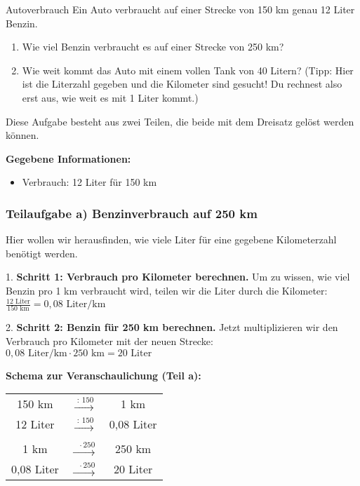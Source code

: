 \begin{aufgabenumgebung}[aufg:2.2]{Autoverbrauch} %
Ein Auto verbraucht auf einer Strecke von 150 km genau 12 Liter Benzin.
\begin{enumerate}
    \item Wie viel Benzin verbraucht es auf einer Strecke von 250 km?
    \item Wie weit kommt das Auto mit einem vollen Tank von 40 Litern? (Tipp: Hier ist die Literzahl gegeben und die Kilometer sind gesucht! Du rechnest also erst aus, wie weit es mit 1 Liter kommt.)
\end{enumerate}
\end{aufgabenumgebung}

\begin{loesungsumgebung}[loes:2.2]{} %
Diese Aufgabe besteht aus zwei Teilen, die beide mit dem Dreisatz gelöst werden können.

\textbf{Gegebene Informationen:}
\begin{itemize}
    \item Verbrauch: 12 Liter für 150 km
\end{itemize}

\subsubsection*{Teilaufgabe a) Benzinverbrauch auf 250 km}

Hier wollen wir herausfinden, wie viele Liter für eine gegebene Kilometerzahl benötigt werden.

1.  \textbf{Schritt 1: Verbrauch pro Kilometer berechnen.}
    Um zu wissen, wie viel Benzin pro 1 km verbraucht wird, teilen wir die Liter durch die Kilometer:
    $\frac{12 \text{ Liter}}{150 \text{ km}} = 0,08 \text{ Liter/km}$

2.  \textbf{Schritt 2: Benzin für 250 km berechnen.}
    Jetzt multiplizieren wir den Verbrauch pro Kilometer mit der neuen Strecke:
    $0,08 \text{ Liter/km} \cdot 250 \text{ km} = 20 \text{ Liter}$

\textbf{Schema zur Veranschaulichung (Teil a):}

\begin{center}
\begin{tabular}{c c c}
    150 km & $\xrightarrow{\text{ : } 150}$ & 1 km \\
    12 Liter & $\xrightarrow{\text{ : } 150}$ & 0,08 Liter \\
    \quad \\
    1 km & $\xrightarrow{\text{ } \cdot 250}$ & 250 km \\
    0,08 Liter & $\xrightarrow{\text{ } \cdot 250}$ & 20 Liter \\
\end{tabular}
\end{center}


\end{loesungsumgebung}
